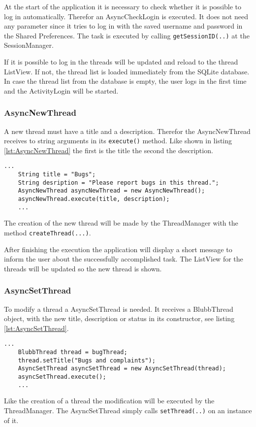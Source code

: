 \documentclass[12pt,a4paper,oneside]{report}
\newcommand{\code}[1]{\lstinline{#1}}
\begin{document}
At the start of the application it is necessary to check whether it is possible to log in automatically.
Therefor an AsyncCheckLogin is executed. It does not need any parameter since it tries to log in with the saved username and password in the Shared Preferences. 
The task is executed by calling \code{getSessionID(..)} at the SessionManager.


If it is possible to log in the threads will be updated and reload to the thread ListView. If not, the thread list is loaded immediately from the SQLite database. In case the thread list from the database is empty, the user logs in the first time and the ActivityLogin will be started.

\subsubsection{AsyncNewThread}
\label{subsubsec:AsyncNewThread}
A new thread must have a title and a description. Therefor the AsyncNewThread receives to string arguments in its \code{execute()} method. Like shown in listing \ref{lst:AsyncNewThread} the first is the title the second the description. 
\lstset{language=java}
\begin{lstlisting}[caption=AsyncNewThread example, label=lst:AsyncNewThread]
	...
	String title = "Bugs";
	String desription = "Please report bugs in this thread.";
	AsyncNewThread asyncNewThread = new AsyncNewThread();
	asyncNewThread.execute(title, description);
	...
\end{lstlisting}
The creation of the new thread will be made by the ThreadManager with the method \code{createThread(...)}.


After finishing the execution the application will display a short message to inform the user about the successfully accomplished task. The ListView for the threads will be updated so the new thread is shown.

\subsubsection{AsyncSetThread}
\label{subsubsec:AsyncSetThread}
To modify a thread a AsyncSetThread is needed. It receives a BlubbThread object, with the new title, description or status in its constructor, see listing \ref{lst:AsyncSetThread}.

\begin{lstlisting}[caption=AsyncSetThread example, label=lst:AsyncSetThread]
	...
	BlubbThread thread = bugThread;
	thread.setTitle("Bugs and complaints");
	AsyncSetThread asyncSetThread = new AsyncSetThread(thread);
	asyncSetThread.execute();
	...
\end{lstlisting}
Like the creation of a thread the modification will be executed by the ThreadManager. The AsyncSetThread simply calls \code{setThread(..)} on an instance of it.
\end{document}
